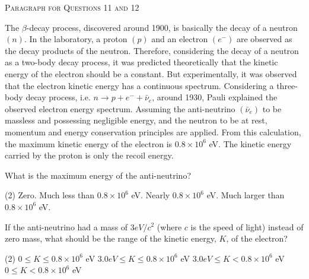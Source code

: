 \begin{center}
    \textsc{Paragraph for Questions 11 and 12}
\end{center}

The $\beta$-decay process, discovered around 1900, is basically the decay of a neutron $(n)$. In the laboratory, a proton $(p)$ and an electron $(e^-)$ are observed as the decay products of the neutron. Therefore, considering the decay of a neutron as a two-body decay process, it was predicted theoretically that the kinetic energy of the electron should be a constant. But experimentally, it was observed that the electron kinetic energy has a continuous spectrum. Considering a three-body decay process, i.e. $n \rightarrow p + e^- + \bar{\nu}_e$, around 1930, Pauli explained the observed electron energy spectrum. Assuming the anti-neutrino $(\bar{\nu}_e)$ to be massless and possessing negligible energy, and the neutron to be at rest, momentum and energy conservation principles are applied. From this calculation, the maximum kinetic energy of the electron is $0.8 \times 10^6$ eV. The kinetic energy carried by the proton is only the recoil energy.

\item What is the maximum energy of the anti-neutrino?
    \begin{tasks}(2)
        \task Zero.
        \task Much less than $0.8 \times 10^6$ eV.
        \task Nearly $0.8 \times 10^6$ eV.
        \task Much larger than $0.8 \times 10^6$ eV.
    \end{tasks}

\item If the anti-neutrino had a mass of $3 eV/c^2$ (where $c$ is the speed of light) instead of zero mass, what should be the range of the kinetic energy, $K$, of the electron?
    \begin{tasks}(2)
        \task $0 \leq K \leq 0.8 \times 10^6$ eV
        \task $3.0 eV \leq K \leq 0.8 \times 10^6$ eV
        \task $3.0 eV \leq K < 0.8 \times 10^6$ eV
        \task $0 \leq K < 0.8 \times 10^6$ eV
    \end{tasks}